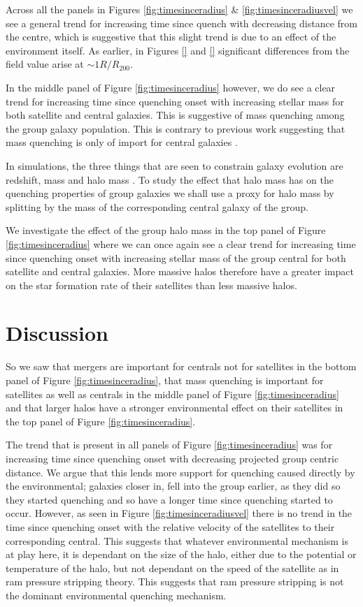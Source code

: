 \documentclass[useAMS,usenatbib]{mn2e}
\begin{document}
Across all the panels in Figures \ref{fig:timesinceradius} \& \ref{fig:timesinceradiusvel} we see a general trend for increasing time since quench with decreasing distance from the centre, which is suggestive that this slight trend is due to an effect of the environment itself. As earlier, in Figures \ref{} and \ref{} significant differences from the field value arise at $\sim 1R/R_{200}$. 

In the middle panel of Figure \ref{fig:timesinceradius} however, we do see a clear trend for increasing time since quenching onset with increasing stellar mass for both satellite and central galaxies. This is suggestive of mass quenching among the group galaxy population. This is contrary to previous work suggesting that mass quenching is only of import for central galaxies \cite{ref, ref, ref}. 

In simulations, the three things that are seen to constrain galaxy evolution are redshift, mass and halo mass \cite{ref, ref}. To study the effect that halo mass has on the quenching properties of group galaxies we shall use a proxy for halo mass by splitting by the mass of the corresponding central galaxy of the group.

We investigate the effect of the group halo mass in the top panel of Figure \ref{fig:timesinceradius} where we can once again see a clear trend for increasing time since quenching onset with increasing stellar mass of the group central for both satellite and central galaxies. More massive halos therefore have a greater impact on the star formation rate of their satellites than less massive halos. 


\section{Discussion}\label{sec:disc}

So we saw that mergers are important for centrals not for satellites in the bottom panel of Figure \ref{fig:timesinceradius}, that mass quenching is important for satellites as well as centrals in the middle panel of Figure \ref{fig:timesinceradius} and that larger halos have a stronger environmental effect on their satellites in the top panel of Figure \ref{fig:timesinceradius}. 

The trend that is present in all panels of Figure \ref{fig:timesinceradius} was for increasing time since quenching onset with decreasing projected group centric distance. We argue that this lends more support for quenching caused directly by the environmental; galaxies closer in, fell into the group earlier, as they did so they started quenching and so have a longer time since quenching started to occur. However, as seen in Figure \ref{fig:timesinceradiusvel} there is no trend in the time since quenching onset with the relative velocity of the satellites to their corresponding central. This suggests that whatever environmental mechanism is at play here, it is dependant on the size of the halo, either due to the potential or temperature of the halo, but not dependant on the speed of the satellite as in ram pressure stripping theory. This suggests that ram pressure stripping is not the dominant environmental quenching mechanism. 
\end{document}
